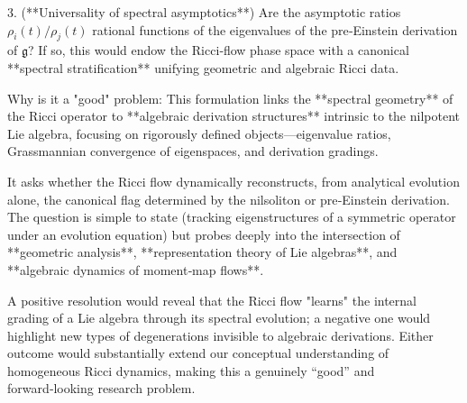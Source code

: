 3. (**Universality of spectral asymptotics**)  Are the asymptotic ratios \(\rho_i(t)/\rho_j(t)\) rational functions of the eigenvalues of the pre‑Einstein derivation of \(\mathfrak{g}\)?  If so, this would endow the Ricci‑flow phase space with a canonical **spectral stratification** unifying geometric and algebraic Ricci data.

Why is it a "good" problem:  
This formulation links the **spectral geometry** of the Ricci operator to **algebraic derivation structures** intrinsic to the nilpotent Lie algebra, focusing on rigorously defined objects—eigenvalue ratios, Grassmannian convergence of eigenspaces, and derivation gradings.  

It asks whether the Ricci flow dynamically reconstructs, from analytical evolution alone, the canonical flag determined by the nilsoliton or pre‑Einstein derivation.  The question is simple to state (tracking eigenstructures of a symmetric operator under an evolution equation) but probes deeply into the intersection of **geometric analysis**, **representation theory of Lie algebras**, and **algebraic dynamics of moment‑map flows**.  

A positive resolution would reveal that the Ricci flow "learns" the internal grading of a Lie algebra through its spectral evolution; a negative one would highlight new types of degenerations invisible to algebraic derivations.  Either outcome would substantially extend our conceptual understanding of homogeneous Ricci dynamics, making this a genuinely “good” and forward‑looking research problem.